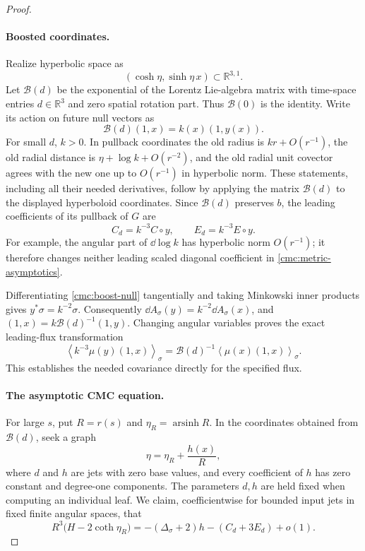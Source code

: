 \begin{proof}
\paragraph{Boosted coordinates.}
Realize hyperbolic space as
\[
 (\cosh\eta,\sinh\eta\,x)\subset\mathbb R^{3,1}.
\]
Let \(\mathcal B(d)\) be the exponential of the Lorentz Lie-algebra
matrix with time-space entries \(d\in\mathbb R^3\) and zero spatial
rotation part.  Thus \(\mathcal B(0)\) is the identity.
Write its action on future null vectors as
\begin{equation}\label{cmc:boost-null}
 \mathcal B(d)(1,x)=k(x)(1,y(x)).
\end{equation}
For small \(d\), \(k>0\).
In pullback coordinates the old radius is \(kr+O(r^{-1})\), the old
radial distance is \(\eta+\log k+O(r^{-2})\), and the old radial unit
covector agrees with the new one up to \(O(r^{-1})\) in hyperbolic
norm.  These statements, including all their needed derivatives,
follow by applying the matrix \(\mathcal B(d)\) to the displayed
hyperboloid coordinates.  Since \(\mathcal B(d)\) preserves \(b\),
the leading coefficients of its pullback of \(G\) are
\begin{equation}\label{cmc:boost-aspect}
 C_d=k^{-3}C\circ y,\qquad E_d=k^{-3}E\circ y.
\end{equation}
For example, the angular part of \(\dd\log k\) has hyperbolic norm
\(O(r^{-1})\); it therefore changes neither leading scaled diagonal
coefficient in \eqref{cmc:metric-asymptotics}.

Differentiating \eqref{cmc:boost-null} tangentially and taking
Minkowski inner products gives \(y^*\sigma=k^{-2}\sigma\).
Consequently \(\dd A_\sigma(y)=k^{-2}\dd A_\sigma(x)\), and
\((1,x)=k\mathcal B(d)^{-1}(1,y)\).  Changing angular variables proves
the exact leading-flux transformation
\begin{equation}\label{cmc:boost-mass}
 \left\langle k^{-3}\mu(y)(1,x)\right\rangle_\sigma
 =\mathcal B(d)^{-1}\left\langle\mu(x)(1,x)\right\rangle_\sigma.
\end{equation}
This establishes the needed covariance directly for the specified
flux.

\paragraph{The asymptotic CMC equation.}
For large \(s\), put \(R=r(s)\) and \(\eta_R=\operatorname{arsinh}R\).
In the coordinates obtained from \(\mathcal B(d)\), seek a graph
\begin{equation}\label{cmc:far-graph}
 \eta=\eta_R+\frac{h(x)}{R},
\end{equation}
where \(d\) and \(h\) are jets with zero base values, and every
coefficient of \(h\) has zero constant and degree-one components.
The parameters \(d,h\) are held fixed when computing an individual
leaf.  We claim, coefficientwise for bounded input jets in fixed
finite angular spaces, that
\begin{equation}\label{cmc:mean-curvature-asymptotic}
 R^3\bigl(H-2\coth\eta_R\bigr)
 =-(\Delta_\sigma+2)h-(C_d+3E_d)+o(1).
\end{equation}


\end{proof}
